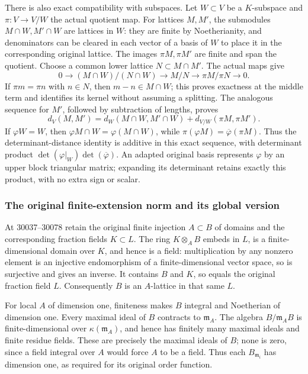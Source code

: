 There is also exact compatibility with subspaces. Let \(W\subset V\) be a \(K\)-subspace and \(\pi:V\to V/W\) the actual quotient map. For lattices \(M,M'\), the submodules \(M\cap W,M'\cap W\) are lattices in \(W\): they are finite by Noetherianity, and denominators can be cleared in each vector of a basis of \(W\) to place it in the corresponding original lattice. The images \(\pi M,\pi M'\) are finite and span the quotient. Choose a common lower lattice \(N\subset M\cap M'\). The actual maps give \[
 0\longrightarrow (M\cap W)/(N\cap W)
 \longrightarrow M/N\longrightarrow \pi M/\pi N\longrightarrow0.
\] If \(\pi m=\pi n\) with \(n\in N\), then \(m-n\in M\cap W\); this proves exactness at the middle term and identifies its kernel without assuming a splitting. The analogous sequence for \(M'\), followed by subtraction of lengths, proves \[
 d_V(M,M')=
 d_W(M\cap W,M'\cap W)+
 d_{V/W}(\pi M,\pi M').
\] If \(\varphi W=W\), then \(\varphi M\cap W=\varphi(M\cap W)\), while \(\pi(\varphi M)=\overline\varphi(\pi M)\). Thus the determinant-distance identity is additive in this exact sequence, with determinant product \(\det(\varphi|_W)\det(\overline\varphi)\). An adapted original basis represents \(\varphi\) by an upper block triangular matrix; expanding its determinant retains exactly this product, with no extra sign or scalar.

\subsubsection{The original finite-extension norm and its global version}\label{algebra-proof-030-the-original-finite-extension-norm-and-its-global-version}

At 30037--30078 retain the original finite injection \(A\subset B\) of domains and the corresponding fraction fields \(K\subset L\). The ring \(K\otimes_A B\) embeds in \(L\), is a finite-dimensional domain over \(K\), and hence is a field: multiplication by any nonzero element is an injective endomorphism of a finite-dimensional vector space, so is surjective and gives an inverse. It contains \(B\) and \(K\), so equals the original fraction field \(L\). Consequently \(B\) is an \(A\)-lattice in that same \(L\).

For local \(A\) of dimension one, finiteness makes \(B\) integral and Noetherian of dimension one. Every maximal ideal of \(B\) contracts to \(\mathfrak m_A\). The algebra \(B/\mathfrak m_AB\) is finite-dimensional over \(\kappa(\mathfrak m_A)\), and hence has finitely many maximal ideals and finite residue fields. These are precisely the maximal ideals of \(B\); none is zero, since a field integral over \(A\) would force \(A\) to be a field. Thus each \(B_{\mathfrak m_i}\) has dimension one, as required for its original order function.


